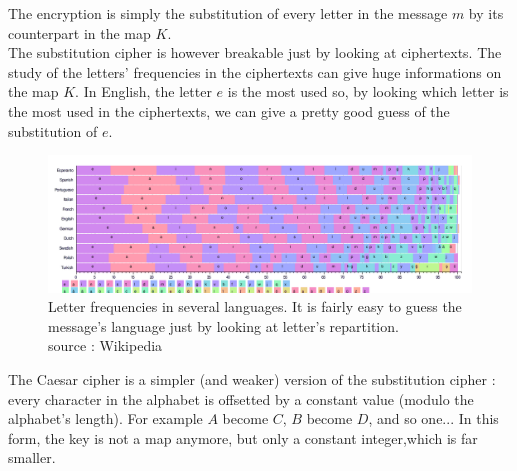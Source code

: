 \begin{table}[!ht]
    \centering
	\caption{Exemple of a encryption using the substitution procedure}
	\label{tab:ExempleSubstitutionEncryption}
\end{table}


The encryption is simply the substitution of every letter in the message $m$ by its counterpart in the map $K$.\\
The substitution cipher is however breakable just by looking at ciphertexts. The study of the letters' frequencies in the ciphertexts can give huge informations on the map $K$. In English, the letter $e$ is the most used so, by looking which letter is the most used in the ciphertexts, we can give a pretty good guess of the substitution of $e$.\\

\begin{figure}[ht!]
    \centering
		\includegraphics[width=\textwidth]{images/letter_frequency}
	\caption{Letter frequencies in several languages. It is fairly easy to guess the message's language just by looking at letter's repartition. \\ source : Wikipedia}
	\label{fig:LetterFrequency}
\end{figure}

The Caesar cipher is a simpler (and weaker) version of the substitution cipher : every character in the alphabet is offsetted by a constant value (modulo the alphabet's length). For example $A$ become $C$, $B$ become $D$, and so one... In this form, the key is not a map anymore, but only a constant integer,which is far smaller. 

%    


